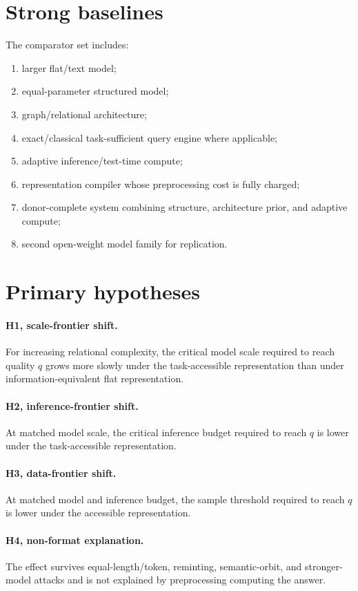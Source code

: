 \documentclass[11pt]{article}
\begin{document}
\section{Strong baselines}
The comparator set includes:
\begin{enumerate}
    \item larger flat/text model;
    \item equal-parameter structured model;
    \item graph/relational architecture;
    \item exact/classical task-sufficient query engine where applicable;
    \item adaptive inference/test-time compute;
    \item representation compiler whose preprocessing cost is fully charged;
    \item donor-complete system combining structure, architecture prior, and adaptive compute;
    \item second open-weight model family for replication.
\end{enumerate}

\section{Primary hypotheses}
\paragraph{H1, scale-frontier shift.}
For increasing relational complexity, the critical model scale required to reach quality $q$ grows more slowly under the task-accessible representation than under information-equivalent flat representation.

\paragraph{H2, inference-frontier shift.}
At matched model scale, the critical inference budget required to reach $q$ is lower under the task-accessible representation.

\paragraph{H3, data-frontier shift.}
At matched model and inference budget, the sample threshold required to reach $q$ is lower under the accessible representation.

\paragraph{H4, non-format explanation.}
The effect survives equal-length/token, reminting, semantic-orbit, and stronger-model attacks and is not explained by preprocessing computing the answer.
\end{document}
